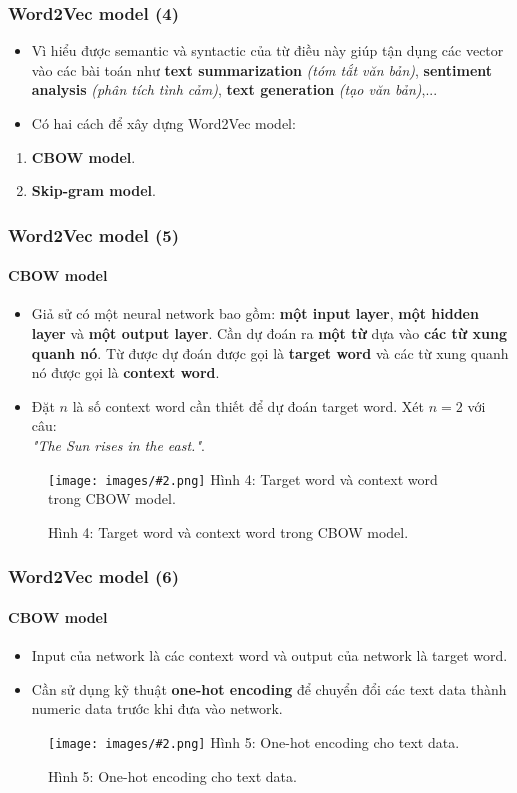 \documentclass[aspectratio=169]{beamer}
\newcommand{\includeImage}[3]{
\begin{figure}[H]
    \centering
    \texttt{[image: images/\#2.png]}
    \def\temp{#3}\ifx\temp\empty\else\caption{#3}\fi
\end{figure}}
\newcommand{\itemsizePaddingLeft}{\setlength{\itemindent}{0.6cm}}
\begin{document}
\begin{frame}
    \frametitle{Word2Vec model (4)}
    \begin{itemize}
        \item Vì hiểu được semantic và syntactic của từ điều này giúp tận dụng các vector vào các bài toán như \textbf{text summarization} \textit{(tóm tắt văn bản)}, \textbf{sentiment analysis} \textit{(phân tích tình cảm)}, \textbf{text generation} \textit{(tạo văn bản)},...
        \item Có hai cách để xây dựng Word2Vec model:
    \end{itemize}

    \begin{enumerate}
        \itemsizePaddingLeft
        \item \textbf{CBOW model}.
        \item \textbf{Skip-gram model}.
      \end{enumerate}
\end{frame}

\begin{frame}
    \frametitle{Word2Vec model (5)}
    \framesubtitle{CBOW model}
    \begin{itemize}
            \item Giả sử có một neural network bao gồm: \textbf{một input layer}, \textbf{một hidden layer} và \textbf{một output layer}. Cần dự đoán ra \textbf{một từ} dựa vào \textbf{các từ xung quanh nó}. Từ được dự đoán được gọi là \textbf{target word} và các từ xung quanh nó được gọi là \textbf{context word}.
            \item Đặt $n$ là số context word cần thiết để dự đoán target word. Xét $n = 2$ với câu: \\ \textsl{"The Sun rises in the east."}.
    \end{itemize}

    \includeImage{0.65}{04}{Hình 4: Target word và context word trong CBOW model.}
\end{frame}

\begin{frame}
    \frametitle{Word2Vec model (6)}
    \framesubtitle{CBOW model}
    \begin{itemize}
            \item Input của network là các context word và output của network là target word.
            \item Cần sử dụng kỹ thuật \textbf{one-hot encoding} để chuyển đổi các text data thành numeric data trước khi đưa vào network.
    \end{itemize}

    \includeImage{0.47}{05}{Hình 5: One-hot encoding cho text data.}
\end{frame}
\end{document}
